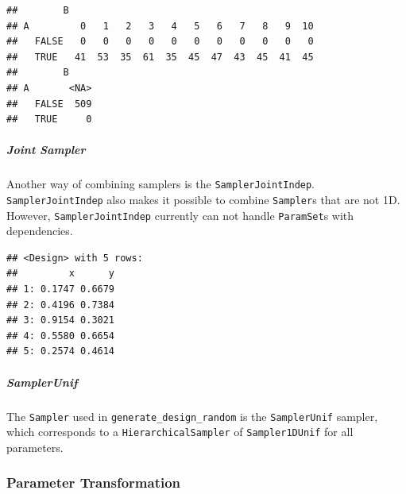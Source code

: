 \documentclass[]{article}
\newenvironment{Shaded}{\begin{snugshade}}{\end{snugshade}}
\newcommand{\DecValTok}[1]{\textcolor[rgb]{0.00,0.00,0.81}{#1}}
\newcommand{\KeywordTok}[1]{\textcolor[rgb]{0.13,0.29,0.53}{\textbf{#1}}}
\newcommand{\NormalTok}[1]{#1}
\newcommand{\OperatorTok}[1]{\textcolor[rgb]{0.81,0.36,0.00}{\textbf{#1}}}
\newcommand{\StringTok}[1]{\textcolor[rgb]{0.31,0.60,0.02}{#1}}
\let\oldsubparagraph\subparagraph
\renewcommand{\subparagraph}[1]{\oldsubparagraph{#1}\mbox{}}
\renewenvironment{Shaded} {\begin{snugshade}\small} {\end{snugshade}}
\begin{document}
\begin{verbatim}
##        B
## A         0   1   2   3   4   5   6   7   8   9  10
##   FALSE   0   0   0   0   0   0   0   0   0   0   0
##   TRUE   41  53  35  61  35  45  47  43  45  41  45
##        B
## A       <NA>
##   FALSE  509
##   TRUE     0
\end{verbatim}

\hypertarget{joint-sampler}{%
\subparagraph{Joint Sampler}\label{joint-sampler}}

Another way of combining samplers is the \texttt{SamplerJointIndep}.
\texttt{SamplerJointIndep} also makes it possible to combine \texttt{Sampler}s that are not 1D.
However, \texttt{SamplerJointIndep} currently can not handle \texttt{ParamSet}s with dependencies.

\begin{Shaded}
\end{Shaded}

\begin{verbatim}
## <Design> with 5 rows:
##         x      y
## 1: 0.1747 0.6679
## 2: 0.4196 0.7384
## 3: 0.9154 0.3021
## 4: 0.5580 0.6654
## 5: 0.2574 0.4614
\end{verbatim}

\hypertarget{samplerunif}{%
\subparagraph{SamplerUnif}\label{samplerunif}}

The \texttt{Sampler} used in \texttt{generate\_design\_random} is the \texttt{SamplerUnif} sampler, which corresponds to a \texttt{HierarchicalSampler} of \texttt{Sampler1DUnif} for all parameters.

\hypertarget{parameter-transformation}{%
\subsubsection{Parameter Transformation}\label{parameter-transformation}}
\end{document}
